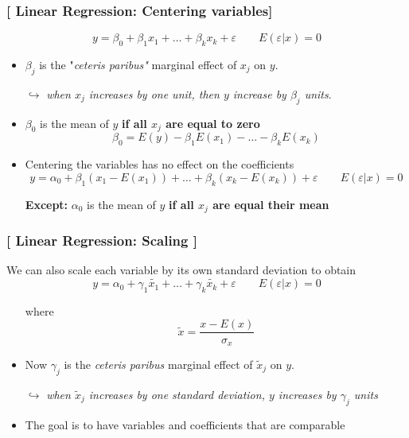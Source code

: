 \documentclass[xcolor=x11names,compress, handhouts]{beamer}
\renewcommand{\(}{\begin{columns}}
\renewcommand{\)}{\end{columns}}
\newcommand{\<}[1]{\begin{column}{#1}}
\renewcommand{\>}{\end{column}}
\begin{document}
\begin{frame} %
\frametitle{\textcolor{brique}{[ Linear Regression: Centering variables]}}
$$
y  = \beta_0 + \beta_1 x_1 + \ldots + \beta_{k} x_k + \varepsilon \qquad E (\varepsilon|x)  = 0
$$
\pause
\begin{itemize}[<+->]
  \item $\beta_j$ is the "\textit{ceteris paribus"} marginal effect of $x_j$ on $y$.
  \item[$\hookrightarrow$]  \textit{when  $x_j$  increases by one unit, then $y$  increase by $\beta_j$ units}.
 \item $\beta_0$ is the mean of $y$ \textbf{if all $x_j$ are equal to zero}
  $$
    \beta_0  = E(y) - \beta_1 E(x_1) - \ldots - \beta_{k} E(x_k)  $$
  \item Centering the variables has no effect on the coefficients
     $$
   y = \alpha_0 + \beta_1 (x_1-E(x_1)) + \ldots + \beta_{k} (x_k-E(x_k))  + \varepsilon \qquad E (\varepsilon|x)  = 0
    $$
  \item[\textbf{Except:}] $ \alpha_0$  is the mean of $y$ \textbf{if all $x_j$ are equal their mean}
\end{itemize}
\end{frame}


\begin{frame} %
\frametitle{\textcolor{brique}{[ Linear Regression: Scaling ]}}

We can also scale each variable by its own standard deviation to obtain
$$
y = \alpha_0 + \gamma_1 \tilde{x_1} + \ldots + \gamma_{k} \tilde{x_k}  + \varepsilon \qquad E (\varepsilon|x)  = 0
$$
\pause
\begin{itemize}[<+->]
  \item[] where $$\tilde{x} = \frac{x-E(x)}{\sigma_x} $$
  \item Now $\gamma_j$ is the \textit{ceteris paribus} marginal effect of $\tilde{x}_j$ on $y$.
   \item[$\hookrightarrow$] \textit{when  $\tilde{x}_j$ increases by one standard deviation,  $y$ increases by $\gamma_j$ units}
  \item The goal is to have variables and coefficients that are comparable
\end{itemize}
\end{frame}
\end{document}
